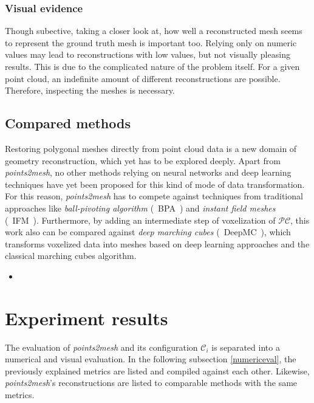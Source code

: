     \subsubsection*{Visual evidence}    
    Though subective, taking a closer look at, how well a reconstructed mesh seems to represent the ground truth mesh is important too. Relying only on 
    numeric values may lead to reconstructions with low values, but not visually pleasing results. This is due to the complicated nature of the problem itself.
    For a given point cloud, an indefinite amount of different reconstructions are possible. Therefore, inspecting the meshes is necessary.

\subsection{Compared methods}

    Restoring polygonal meshes directly from point cloud data is a new domain of geometry reconstruction, 
    which yet has to be explored deeply. Apart from \emph{points2mesh}, no other methods relying on neural 
    networks and deep learning techniques have yet been proposed for this kind of mode of data transformation.
    For this reason, \emph{points2mesh} has to compete against techniques from traditional approaches like
    \emph{ball-pivoting algorithm} \cite{817351}(~BPA~) and \emph{instant field meshes} \cite{Jakob2015Instant} (~IFM~). Furthermore, by adding
    an intermediate step of voxelization of $\mathcal{PC}$, this work also can be compared against 
    \emph{deep marching cubes} \cite{Liao2018CVPR} (~DeepMC~), which transforms voxelized data into meshes based on deep learning approaches and the classical
    marching cubes algorithm.

\begin{itemize}
    \item {}
\end{itemize}

\section{Experiment results}
\label{subsec:results}
    The evaluation of \emph{points2mesh} and its configuration $\mathcal{C}_i$ is separated into a numerical and visual evaluation.
    In the following subsection \ref{numericeval}, the previously explained metrics are listed and compiled against each other.
    Likewise, \emph{points2mesh}'s reconstructions are listed to comparable methods with the same metrics.
